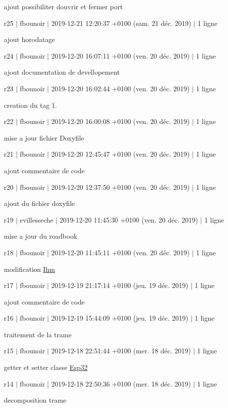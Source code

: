 ajout possibiliter d\textquotesingle{}ouvrir et fermer port

r25 $\vert$ fbounoir $\vert$ 2019-\/12-\/21 12\+:20\+:37 +0100 (sam. 21 déc. 2019) $\vert$ 1 ligne

ajout horodatage

r24 $\vert$ fbounoir $\vert$ 2019-\/12-\/20 16\+:07\+:11 +0100 (ven. 20 déc. 2019) $\vert$ 1 ligne

ajout documentation de devellopement

r23 $\vert$ fbounoir $\vert$ 2019-\/12-\/20 16\+:02\+:44 +0100 (ven. 20 déc. 2019) $\vert$ 1 ligne

creation du tag 1.

r22 $\vert$ fbounoir $\vert$ 2019-\/12-\/20 16\+:00\+:08 +0100 (ven. 20 déc. 2019) $\vert$ 1 ligne

mise a jour fichier Doxyfile

r21 $\vert$ fbounoir $\vert$ 2019-\/12-\/20 12\+:45\+:47 +0100 (ven. 20 déc. 2019) $\vert$ 1 ligne

ajout commentaire de code

r20 $\vert$ fbounoir $\vert$ 2019-\/12-\/20 12\+:37\+:50 +0100 (ven. 20 déc. 2019) $\vert$ 1 ligne

ajout du fichier doxyfile

r19 $\vert$ evillesseche $\vert$ 2019-\/12-\/20 11\+:45\+:30 +0100 (ven. 20 déc. 2019) $\vert$ 1 ligne

mise a jour du roadbook

r18 $\vert$ fbounoir $\vert$ 2019-\/12-\/20 11\+:45\+:11 +0100 (ven. 20 déc. 2019) $\vert$ 1 ligne

modification \hyperlink{class_ihm}{Ihm}

r17 $\vert$ fbounoir $\vert$ 2019-\/12-\/19 21\+:17\+:14 +0100 (jeu. 19 déc. 2019) $\vert$ 1 ligne

ajout commentaire de code

r16 $\vert$ fbounoir $\vert$ 2019-\/12-\/19 15\+:44\+:09 +0100 (jeu. 19 déc. 2019) $\vert$ 1 ligne

traitement de la trame

r15 $\vert$ fbounoir $\vert$ 2019-\/12-\/18 22\+:51\+:44 +0100 (mer. 18 déc. 2019) $\vert$ 1 ligne

getter et setter classe \hyperlink{class_esp32}{Esp32}

r14 $\vert$ fbounoir $\vert$ 2019-\/12-\/18 22\+:50\+:36 +0100 (mer. 18 déc. 2019) $\vert$ 1 ligne

decomposition trame

